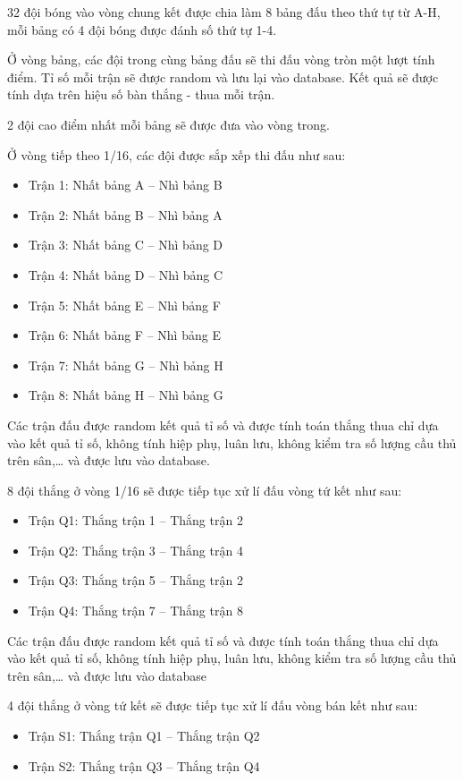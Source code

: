 \documentclass[a4paper]{article}
\begin{document}
32 đội bóng vào vòng chung kết được chia làm 8 bảng đấu theo thứ tự từ A-H, mỗi bảng có 4 đội bóng được đánh số thứ tự 1-4.

Ở vòng bảng, các đội trong cùng bảng đấu sẽ thi đấu vòng tròn một lượt tính điểm. Tỉ số mỗi trận sẽ được random và lưu lại vào database. Kết quả sẽ được tính dựa trên hiệu số bàn thắng - thua mỗi trận.

2 đội cao điểm nhất mỗi bảng sẽ được đưa vào vòng trong.

Ở vòng tiếp theo 1/16, các đội được sắp xếp thi đấu như sau:
\begin{itemize}
\item Trận 1: Nhất bảng A – Nhì bảng B
\item Trận 2: Nhất bảng B – Nhì bảng A
\item Trận 3: Nhất bảng C – Nhì bảng D
\item Trận 4: Nhất bảng D – Nhì bảng C
\item Trận 5: Nhất bảng E – Nhì bảng F
\item Trận 6: Nhất bảng F – Nhì bảng E
\item Trận 7: Nhất bảng G – Nhì bảng H
\item Trận 8: Nhất bảng H – Nhì bảng G
\end{itemize}

Các trận đấu được random kết quả tỉ số và được tính toán thắng thua chỉ dựa vào kết quả tỉ số, không tính hiệp phụ, luân lưu, không kiểm tra số lượng cầu thủ trên sân,… và được lưu vào database.

8 đội thắng ở vòng 1/16 sẽ được tiếp tục xử lí đấu vòng tứ kết như sau:
\begin{itemize}
\item Trận Q1: Thắng trận 1 – Thắng trận 2
\item Trận Q2: Thắng trận 3 – Thắng trận 4
\item Trận Q3: Thắng trận 5 – Thắng trận 2
\item Trận Q4: Thắng trận 7 – Thắng trận 8
\end{itemize}

Các trận đấu được random kết quả tỉ số và được tính toán thắng thua chỉ dựa vào kết quả tỉ số, không tính hiệp phụ, luân lưu, không kiểm tra số lượng cầu thủ trên sân,… và được lưu vào database

4 đội thắng ở vòng tứ kết sẽ được tiếp tục xử lí đấu vòng bán kết như sau:
\begin{itemize}
\item Trận S1: Thắng trận Q1 – Thắng trận Q2
\item Trận S2: Thắng trận Q3 – Thắng trận Q4
\end{itemize}
\end{document}
